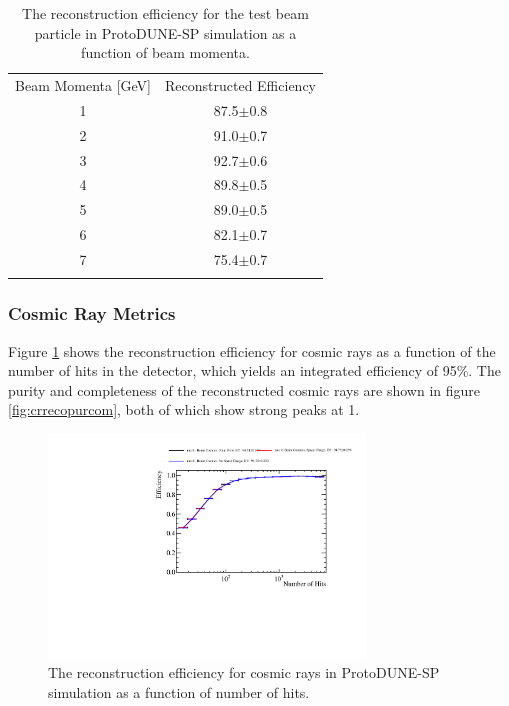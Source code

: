 \begin{table}
\centering
\caption{The reconstruction efficiency for the test beam particle in ProtoDUNE-SP simulation as a function of beam momenta.}
\label{tab:1} 
\begin{tabular}{cc}
\hline\noalign{\smallskip}
Beam Momenta [GeV] & Reconstructed Efficiency  \\
\noalign{\smallskip}\hline\noalign{\smallskip}
1 & 87.5$\pm$0.8 \\
2 & 91.0$\pm$0.7 \\
3 & 92.7$\pm$0.6 \\
4 & 89.8$\pm$0.5 \\
5 & 89.0$\pm$0.5 \\
6 & 82.1$\pm$0.7 \\
7 & 75.4$\pm$0.7 \\
\noalign{\smallskip}\hline
\end{tabular}
\end{table}

\subsubsection{Cosmic Ray Metrics}
\label{sec:crmetrics}
Figure \ref{fig:crrecoeff} shows the reconstruction efficiency for cosmic rays as a function of the number of hits in the detector, which yields an integrated efficiency of 95\%.  The purity and completeness of the reconstructed cosmic rays are shown in figure \ref{fig:crrecopurcom}, both of which show strong peaks at 1.

\begin{figure}
\centering
\includegraphics[width=0.75\textwidth]{Figures/Metrics/MC/Cosmics/CosmicRayEfficiencyVsNHits.pdf}
\caption{The reconstruction efficiency for cosmic rays in ProtoDUNE-SP simulation as a function of number of hits.}
\label{fig:crrecoeff}
\end{figure}

